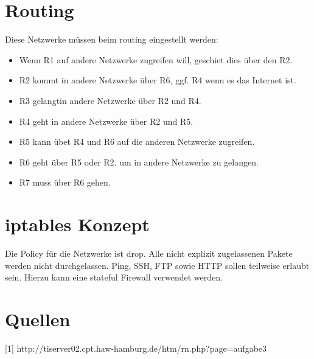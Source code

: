 \documentclass[a4paper,10pt]{article}
\begin{document}
\section{Routing}
Diese Netzwerke müssen beim routing eingestellt werden:\newline
\begin{itemize}
 \item Wenn R1 auf andere Netzwerke zugreifen will, geschiet dies über den R2. 
 \item R2 kommt in andere Netzwerke über R6, ggf. R4 wenn es das Internet ist.
 \item R3 gelangtin andere Netzwerke über R2 und R4.
 \item R4 geht in andere Netzwerke über R2 und R5.
 \item R5 kann übet R4 und R6 auf die anderen Netzwerke zugreifen.
 \item R6 geht über R5 oder R2. um in andere Netzwerke zu gelangen.
 \item R7 muss über R6 gehen.
\end{itemize}

\section{iptables Konzept}
Die Policy für die Netzwerke ist drop. Alle nicht explizit zugelassenen Pakete werden nicht durchgelassen.
Ping, SSH, FTP sowie HTTP sollen teilweise erlaubt sein. Hierzu kann eine stateful Firewall verwendet werden.

\section{Quellen}
[1] http://tiserver02.cpt.haw-hamburg.de/htm/rn.php?page=aufgabe3
\end{document}
